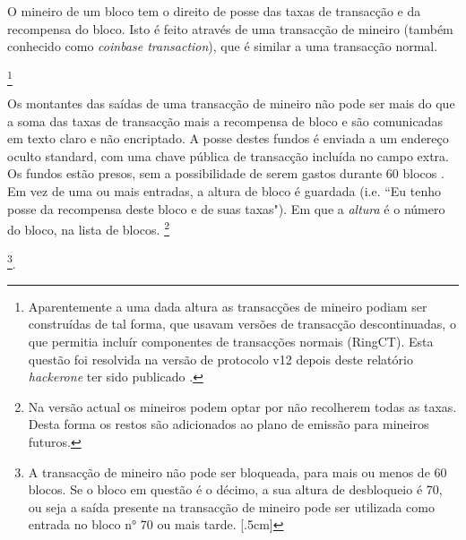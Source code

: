 O mineiro de um bloco tem o direito de posse das taxas de transacção e da recompensa do bloco. Isto é feito através de uma transacção de mineiro (também conhecido como {\em coinbase transaction}), que é similar a uma transacção normal.  

\footnote{Aparentemente a uma dada altura as transacções de mineiro podiam ser construídas de tal forma, que usavam versões de transacção descontinuadas, o que permitia incluír componentes de transacções normais (RingCT). 
Esta questão foi resolvida na versão de protocolo v12 depois deste relatório {\em hackerone} ter sido publicado \cite{miner-tx-checks}.}

Os montantes das saídas de uma transacção de mineiro não pode ser mais do que a soma das taxas de transacção mais a recompensa de bloco e são comunicadas em texto claro e não encriptado. A posse destes fundos é enviada a um endereço oculto standard, com uma chave pública de transacção incluída no campo extra. Os fundos estão presos, sem a possibilidade de serem gastos durante 60 blocos \cite{transaction-lock}. Em vez de uma ou mais entradas, a altura de bloco é guardada (i.e. ``Eu tenho posse da recompensa deste bloco e de suas taxas"). Em que a {\em altura} é o número do bloco, na lista de blocos.   
\footnote{Na versão actual os mineiros podem optar por não recolherem todas as taxas. Desta forma os restos são adicionados ao plano de emissão para mineiros futuros.} 

\footnote{A transacção de mineiro não pode ser bloqueada, para mais ou menos de 60 blocos. Se o bloco em questão é o décimo, a sua altura de desbloqueio é 70, ou seja a saída presente na transacção de mineiro pode ser utilizada como entrada no bloco n° 70 ou mais tarde.
[.5cm]}.%

